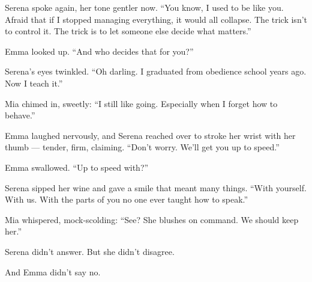 Serena spoke again, her tone gentler now. ``You know, I used to be like you. Afraid that if I stopped 
managing everything, it would all collapse. The trick isn’t to control it. The trick is to let someone 
else decide what matters.''

Emma looked up. ``And who decides that for you?''

Serena’s eyes twinkled. ``Oh darling. I graduated from obedience school years ago. Now I teach it.''

Mia chimed in, sweetly: ``I still like going. Especially when I forget how to behave.''

Emma laughed nervously, and Serena reached over to stroke her wrist with her thumb — tender, firm, claiming.
``Don’t worry. We’ll get you up to speed.''

Emma swallowed. ``Up to speed with?''

Serena sipped her wine and gave a smile that meant many things.
``With yourself. With us. With the parts of you no one ever taught how to speak.''

Mia whispered, mock-scolding: ``See? She blushes on command. We should keep her.''

Serena didn’t answer. But she didn’t disagree.

And Emma didn’t say no.

\medskip

